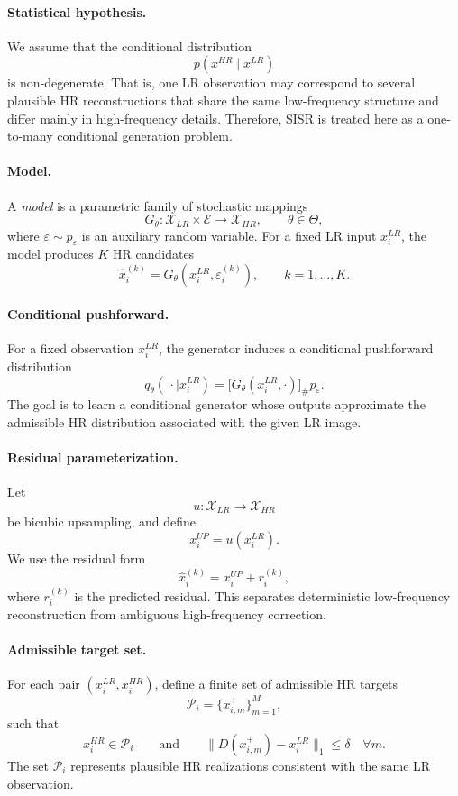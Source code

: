 \documentclass{article}
\begin{document}
\paragraph{Statistical hypothesis.}
We assume that the conditional distribution
\[
p(x^{HR}\mid x^{LR})
\]
is non-degenerate. That is, one LR observation may correspond to several plausible HR reconstructions that share the same low-frequency structure and differ mainly in high-frequency details. Therefore, SISR is treated here as a one-to-many conditional generation problem.

\paragraph{Model.}
A \emph{model} is a parametric family of stochastic mappings
\[
G_{\theta}:\mathcal{X}_{LR}\times\mathcal{E}\to\mathcal{X}_{HR},
\qquad \theta\in\Theta,
\]
where \(\varepsilon\sim p_{\varepsilon}\) is an auxiliary random variable. For a fixed LR input \(x_i^{LR}\), the model produces \(K\) HR candidates
\[
\hat{x}_i^{(k)} = G_{\theta}(x_i^{LR},\varepsilon_i^{(k)}),
\qquad k=1,\dots,K.
\]

\paragraph{Conditional pushforward.}
For a fixed observation \(x_i^{LR}\), the generator induces a conditional pushforward distribution
\[
q_{\theta}(\,\cdot \mid x_i^{LR})
=
\bigl[G_{\theta}(x_i^{LR},\cdot)\bigr]_{\#} p_{\varepsilon}.
\]
The goal is to learn a conditional generator whose outputs approximate the admissible HR distribution associated with the given LR image.

\paragraph{Residual parameterization.}
Let
\[
u:\mathcal{X}_{LR}\to\mathcal{X}_{HR}
\]
be bicubic upsampling, and define
\[
x_i^{UP}=u(x_i^{LR}).
\]
We use the residual form
\[
\hat{x}_i^{(k)} = x_i^{UP} + r_i^{(k)},
\]
where \(r_i^{(k)}\) is the predicted residual. This separates deterministic low-frequency reconstruction from ambiguous high-frequency correction.

\paragraph{Admissible target set.}
For each pair \((x_i^{LR},x_i^{HR})\), define a finite set of admissible HR targets
\[
\mathcal{P}_i=\{x_{i,m}^{+}\}_{m=1}^{M},
\]
such that
\[
x_i^{HR}\in\mathcal{P}_i
\qquad\text{and}\qquad
\|D(x_{i,m}^{+})-x_i^{LR}\|_1 \le \delta
\quad \forall m.
\]
The set \(\mathcal{P}_i\) represents plausible HR realizations consistent with the same LR observation.
\end{document}
